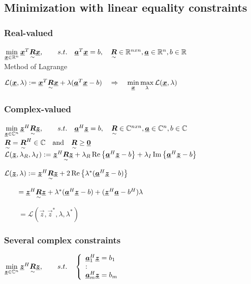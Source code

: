 \subsection{Minimization with linear equality constraints }

\subsubsection{Real-valued}
$\min\limits_{\vec{x}\in\mathbb{R}^n} \vec{x}^T\ma{R}\vec{x}, \qquad s.t.\quad  \vec{a}^T\vec{x}=b,  \quad \ma{R}\in\mathbb{R}^{nxn}, \vec{a}\in\mathbb{R}^n, b\in\mathbb{R}$ \ \\

Method of Lagrange 

$\mathcal{L}(\vec{x},\lambda):= \vec{x}^T\ma{R}\vec{x}+\lambda(\vec{a}^T\vec{x}-b)\quad \Rightarrow \quad \min\limits_{\vec{x}}\max\limits_{\lambda}\mathcal{L}(\vec{x},\lambda)$


\subsubsection{Complex-valued}
$\min\limits_{\vec{z}\in\mathbb{C}^n} \vec{z}^H\ma{R}\vec{z}, \qquad s.t.\quad  \vec{a}^H\vec{z}=b,  \quad \ma{R}\in\mathbb{C}^{nxn}, \vec{a}\in\mathbb{C}^n, b\in\mathbb{C}$\ \\ 

$\ma{R}=\ma{R}^H \in \mathbb{C} \quad \text{and} \quad\ma{R} \geq \vec{0}$\\

$ \mathcal{L}(\vec{z},\lambda_R,\lambda_I):= \vec{z}^H\ma{R}\vec{z}+\lambda_R\Re{\vec{a}^H\vec{z}-b}+\lambda_I\Im{\vec{a}^H\vec{z}-b}$

$ \mathcal{L}(\vec{z},\lambda):= \vec{z}^H\ma{R}\vec{z}+2\Re{\lambda^*(\vec{a}^H\vec{z}-b)}$

$\qquad =\vec{z}^H\ma{R}\vec{z}+\lambda^*(\vec{a}^H\vec{z}-b)+(\vec{z}^H\vec{a}-b^H)\lambda$

$\qquad =\mathcal{L}(\vec{z},\vec{z}^*,\lambda,\lambda^*)$


\subsubsection{Several complex constraints}
$\min\limits_{\vec{z}\in\mathbb{C}^n} \vec{z}^H\ma{R}\vec{z}, 
\qquad s.t.\quad 
\left\lbrace \begin{array}{l} \vec{a}_1^H\vec{z}=b_1\\ \svdots \\ \vec{a}_m^H\vec{z}=b_m \end{array} \right.$

